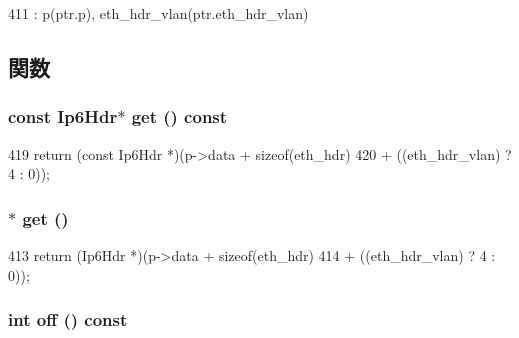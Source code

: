 \begin{DoxyCode}
411 : p(ptr.p), eth_hdr_vlan(ptr.eth_hdr_vlan) { }
\end{DoxyCode}


\subsection{関数}
\hypertarget{classNet_1_1Ip6Ptr_a5f0ef57d1f75ef52759d4affd8772cf7}{
\subsubsection[{get}]{\setlength{\rightskip}{0pt plus 5cm}const {\bf Ip6Hdr}$\ast$ get () const}}
\label{classNet_1_1Ip6Ptr_a5f0ef57d1f75ef52759d4affd8772cf7}



\begin{DoxyCode}
419     { return (const Ip6Hdr *)(p->data + sizeof(eth_hdr)
420                               + ((eth_hdr_vlan) ? 4 : 0)); }
\end{DoxyCode}
\hypertarget{classNet_1_1Ip6Ptr_af8951ecff7acf8200ba3355263f4e10c}{
\subsubsection[{get}]{$\ast$ get ()}}
\label{classNet_1_1Ip6Ptr_af8951ecff7acf8200ba3355263f4e10c}



\begin{DoxyCode}
413                   { return (Ip6Hdr *)(p->data + sizeof(eth_hdr)
414                                       + ((eth_hdr_vlan) ? 4 : 0)); }
\end{DoxyCode}
\hypertarget{classNet_1_1Ip6Ptr_a81fa7ab0c6e92d4496ee915a8a3705f9}{
\subsubsection[{off}]{\setlength{\rightskip}{0pt plus 5cm}int off () const}}
\label{classNet_1_1Ip6Ptr_a81fa7ab0c6e92d4496ee915a8a3705f9}




